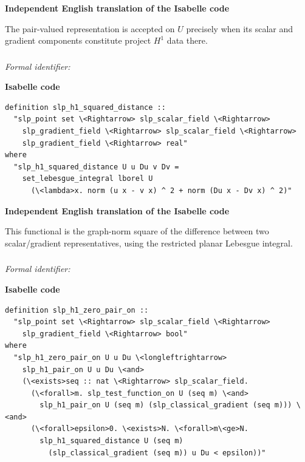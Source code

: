 \documentclass[10pt,oneside]{article}
\newcommand{\reviewlabel}[1]{\par\smallskip\noindent\textsf{\bfseries #1}\par\smallskip}
\begin{document}
\reviewlabel{Independent English translation of the Isabelle code}
The pair-valued representation is accepted on $U$ precisely when its scalar and gradient components constitute project $H^1$ data there.

\subsubsection{\texttt{}}
\noindent\textit{Formal identifier:} \texttt{}

\reviewlabel{Isabelle code}
\begin{lstlisting}
definition slp_h1_squared_distance ::
  "slp_point set \<Rightarrow> slp_scalar_field \<Rightarrow>
    slp_gradient_field \<Rightarrow> slp_scalar_field \<Rightarrow>
    slp_gradient_field \<Rightarrow> real"
where
  "slp_h1_squared_distance U u Du v Dv =
    set_lebesgue_integral lborel U
      (\<lambda>x. norm (u x - v x) ^ 2 + norm (Du x - Dv x) ^ 2)"
\end{lstlisting}

\reviewlabel{Independent English translation of the Isabelle code}
This functional is the graph-norm square of the difference between two scalar/gradient representatives, using the restricted planar Lebesgue integral.

\subsubsection{\texttt{}}
\noindent\textit{Formal identifier:} \texttt{}

\reviewlabel{Isabelle code}
\begin{lstlisting}
definition slp_h1_zero_pair_on ::
  "slp_point set \<Rightarrow> slp_scalar_field \<Rightarrow>
    slp_gradient_field \<Rightarrow> bool"
where
  "slp_h1_zero_pair_on U u Du \<longleftrightarrow>
    slp_h1_pair_on U u Du \<and>
    (\<exists>seq :: nat \<Rightarrow> slp_scalar_field.
      (\<forall>m. slp_test_function_on U (seq m) \<and>
        slp_h1_pair_on U (seq m) (slp_classical_gradient (seq m))) \<and>
      (\<forall>epsilon>0. \<exists>N. \<forall>m\<ge>N.
        slp_h1_squared_distance U (seq m)
          (slp_classical_gradient (seq m)) u Du < epsilon))"
\end{lstlisting}
\end{document}
